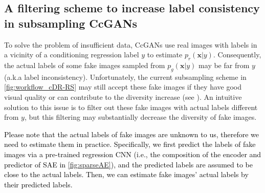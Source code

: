 \documentclass[final,12pt, 3p,times]{elsarticle}
\def\rev#1{\textcolor{black}{#1}}
\begin{document}
\subsection{A filtering scheme to increase label consistency in subsampling CcGANs}\label{sec:filtering_CcGAN}
To solve the problem of insufficient data, CcGANs \cite{ding2021ccgan, ding2020continuous} use real images with labels in a vicinity of a conditioning regression label $y$ to estimate $p_r(\bm{x}|y)$. Consequently, the actual labels of some fake images sampled from $p_g(\bm{x}|y)$ may be far from $y$ (a.k.a label inconsistency). Unfortunately, the current subsampling scheme in \cref{fig:workflow_cDR-RS} may still accept these fake images if they have good visual quality or can contribute to the diversity increase (see ). An intuitive solution to this issue is to filter out these fake images with actual labels different from $y$, but this filtering may substantially decrease the diversity of fake images. 

\rev{Please note that the actual labels of fake images are unknown to us, therefore we need to estimate them in practice. Specifically, we first predict the labels of fake images via a pre-trained regression CNN (i.e., the composition of the encoder and predictor of SAE in \cref{fig:sparseAE}), and the predicted labels are assumed to be close to the actual labels. Then, we can estimate fake images' actual labels by their predicted labels.}
\end{document}

